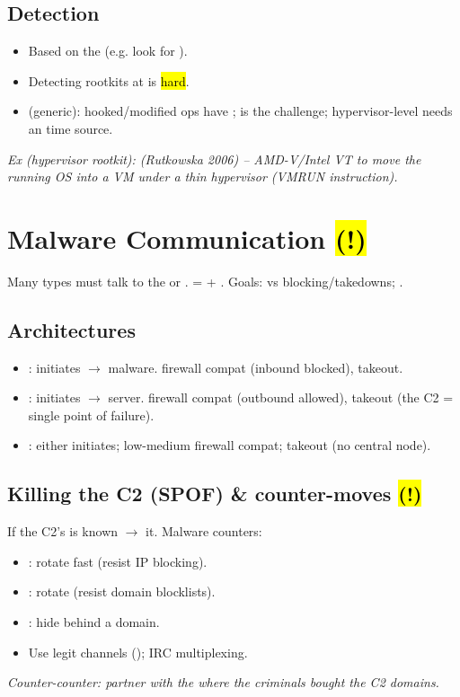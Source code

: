 \subsection{Detection}
\begin{itemize}
\item Based on the  (e.g. look for ).
\item Detecting  rootkits at  is \hl{hard}.
\item {} (generic): hooked/modified ops have ;  is the challenge; hypervisor-level needs an  time source.
\end{itemize}
\textit{Ex (hypervisor rootkit):  (Rutkowska 2006) -- AMD-V/Intel VT to move the running OS into a VM  under a thin hypervisor (VMRUN instruction).}

\section{Malware Communication \hl{(!)}}
Many types must talk to the  or . =  + . Goals:  vs blocking/takedowns; .

\subsection{Architectures}
\begin{itemize}
\item {}:  initiates $\to$ malware.  firewall compat (inbound blocked),  takeout.
\item {}:  initiates $\to$  server.  firewall compat (outbound allowed), takeout  (the C2 = single point of failure).
\item {}: either initiates; low-medium firewall compat; takeout  (no central node).
\end{itemize}

\subsection{Killing the C2 (SPOF) \& counter-moves \hl{(!)}}
If the C2's  is known $\to$  it. Malware counters:
\begin{itemize}
\item {}: rotate  fast (resist IP blocking).
\item {}: rotate  (resist domain blocklists).
\item {}: hide behind a  domain.
\item Use legit channels (); IRC multiplexing.
\end{itemize}
\textit{Counter-counter: partner with the  where the criminals bought the C2 domains.}

